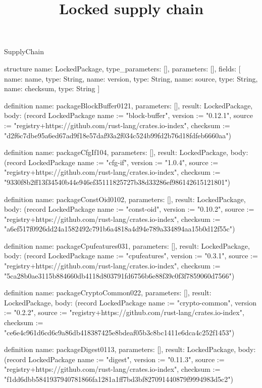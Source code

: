 \begin{lexlean}{SupplyChain}
\title{Locked supply chain}
\begin{semanticmodule}
structure{
  name: LockedPackage,
  type_parameters: [],
  parameters: [],
  fields: [
    {name: name, type: String},
    {name: version, type: String},
    {name: source, type: String},
    {name: checksum, type: String}
  ]
}

definition{
  name: packageBlockBuffer0121,
  parameters: [],
  result: LockedPackage,
  body: (record LockedPackage {name := "block-buffer", version := "0.12.1", source := "registry+https://github.com/rust-lang/crates.io-index", checksum := "d2f6c7dbe95a6ed67ad9f18e57daf93a2f034c524b99fd2b76d18fdfeb6660aa"})
}

definition{
  name: packageCfgIf104,
  parameters: [],
  result: LockedPackage,
  body: (record LockedPackage {name := "cfg-if", version := "1.0.4", source := "registry+https://github.com/rust-lang/crates.io-index", checksum := "9330f8b2ff13f34540b44e946ef35111825727b38d33286ef986142615121801"})
}

definition{
  name: packageConstOid0102,
  parameters: [],
  result: LockedPackage,
  body: (record LockedPackage {name := "const-oid", version := "0.10.2", source := "registry+https://github.com/rust-lang/crates.io-index", checksum := "a6ef517f0926dd24a1582492c791b6a4818a4d94e789a334894aa15b0d12f55c"})
}

definition{
  name: packageCpufeatures031,
  parameters: [],
  result: LockedPackage,
  body: (record LockedPackage {name := "cpufeatures", version := "0.3.1", source := "registry+https://github.com/rust-lang/crates.io-index", checksum := "5ca28b0ae3115b884660db4118d803791fd6756b6e88f39c0f3f7859060d7566"})
}

definition{
  name: packageCryptoCommon022,
  parameters: [],
  result: LockedPackage,
  body: (record LockedPackage {name := "crypto-common", version := "0.2.2", source := "registry+https://github.com/rust-lang/crates.io-index", checksum := "ce6e4c961d6cd6c9a86db418387425e8bdeaf05b3c8bc1411e6dca4c252f1453"})
}

definition{
  name: packageDigest0113,
  parameters: [],
  result: LockedPackage,
  body: (record LockedPackage {name := "digest", version := "0.11.3", source := "registry+https://github.com/rust-lang/crates.io-index", checksum := "f1dd6dbb5841937940781866fa1281a1ff7bd3bf827091440879f9994983d5c2"})
}


\end{semanticmodule}
\end{lexlean}
